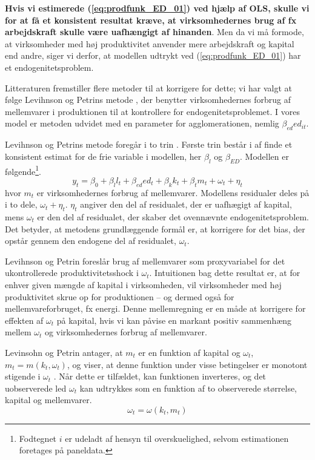 \textbf{Hvis vi estimerede (\ref{eq:prodfunk_ED_01}) ved hjælp af OLS, skulle vi for at få et konsistent resultat kræve, at virksomhedernes brug af fx arbejdskraft skulle være uafhængigt af hinanden}. Men da vi må formode, at virksomheder med høj produktivitet anvender mere arbejdskraft og kapital end andre, siger vi derfor, at modellen udtrykt ved (\ref{eq:prodfunk_ED_01}) har et endogenitetsproblem.

Litteraturen fremstiller flere metoder til at korrigere for dette; vi har valgt at følge Levihnson og Petrins metode \cite{levinsohn2003estimating}, der benytter virksomhedernes forbrug af mellemvarer i produktionen til at kontrollere for endogenitetsproblemet. I vores model er metoden udvidet med en parameter for agglomerationen, nemlig $\beta_{ed} ed_{it}$.

Levihnson og Petrins metode foregår i to trin \cite[p. 115ff.]{petrin2004production}. Første trin består i af finde et konsistent estimat for de frie variable i modellen, her $\beta_l$ og $\beta_{ED}$. Modellen er følgende\footnote{Fodtegnet $i$ er udeladt af hensyn til overskuelighed, selvom estimationen foretages på paneldata.}.
\begin{equation}
	y_{t} = \beta_0 + \beta_l l_t+ \beta_{ed} ed_t +
	\beta_k k_t + \beta_t m_t + \omega_t + \eta_t
	\label{LP_01}
\end{equation}
hvor $m_t$ er virksomhedernes forbrug af mellemvarer. Modellens residualer deles på i to dele, $\omega_t + \eta_t$. $\eta_t$ angiver den del af residualet, der er uafhægigt af kapital, mens $\omega_t$ er den del af residualet, der skaber det ovennævnte endogenitetsproblem. Det betyder, at metodens grundlæggende formål er, at korrigere for det bias, der opstår gennem den endogene del af residualet, 
$\omega_t$.

Levihnson og Petrin foreslår brug af mellemvarer som proxyvariabel for det ukontrollerede produktivitetsshock i $\omega_t$. Intuitionen bag dette resultat er, at for enhver given mængde af kapital i virksomheden, vil virksomheder med høj produktivitet skrue op for produktionen -- og dermed også for mellemvareforbruget, fx energi. Denne mellemregning er en måde at korrigere for effekten af $\omega_t$ på kapital, hvis vi kan påvise en markant positiv sammenhæng mellem $\omega_t$ og virksomhedernes forbrug af mellemvarer.

Levinsohn og Petrin antager, at $m_t$ er en funktion af kapital og $\omega_t$, $m_t = m(k_t , \omega_t)$, og viser, at denne funktion under visse betingelser er monotont stigende i $\omega_t$ \cite[322-323]{levinsohn2003estimating}. Når dette er tilfældet, kan funktionen inverteres, og det uobserverede led $\omega_t$ kan udtrykkes som en funktion af to observerede størrelse, kapital og mellemvarer.
\begin{equation}
	\omega_t = \omega(k_t , m_t)
	\label{eq:InverseOmega}
\end{equation}

